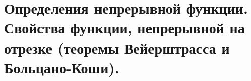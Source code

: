 \section{Определения непрерывной функции. Свойства функции, непрерывной на отрезке (теоремы Вейерштрасса и Больцано-Коши).}

\pagebreak